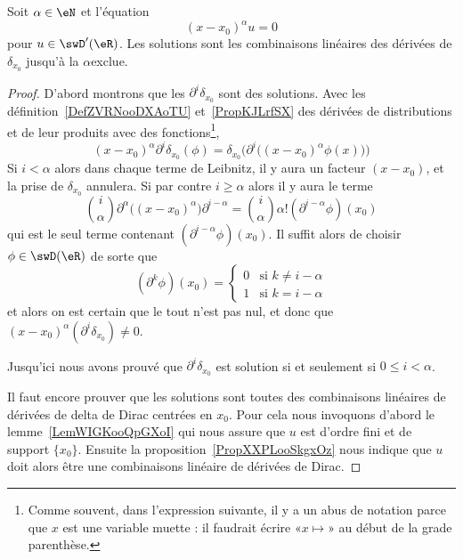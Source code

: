 \begin{theorem}     \label{ThoRDUXooQBlLNb}
    Soit \( \alpha\in \eN\) et l'équation
    \begin{equation}        \label{EqDONTooKPfDWU}
        (x-x_0)^{\alpha}u=0
    \end{equation}
    pour \( u\in\swD'(\eR)\). Les solutions sont les combinaisons linéaires des dérivées de \( \delta_{x_0}\) jusqu'à la \( \alpha\)\ieme exclue.
\end{theorem}

\begin{proof}
    D'abord montrons que les \( \partial^i\delta_{x_0}\) sont des solutions. Avec les définition~\ref{DefZVRNooDXAoTU} et~\ref{PropKJLrfSX} des dérivées de distributions et de leur produits avec des fonctions\footnote{Comme souvent, dans l'expression suivante, il y a un abus de notation parce que \( x\) est une variable muette : il faudrait écrire «\( x\mapsto\)» au début de la grade parenthèse.},
    \begin{equation}
        (x-x_0)^{\alpha}\partial^i\delta_{x_0}(\phi)=\delta_{x_0}\Big( \partial^i\big( (x-x_0)^{\alpha}\phi(x) \big) \Big)
    \end{equation}
    Si \( i<\alpha\) alors dans chaque terme de Leibnitz, il y aura un facteur \( (x-x_0)\), et la prise de \( \delta_{x_0}\) annulera. Si par contre \( i\geq \alpha\) alors il y aura le terme
    \begin{equation}
        \binom{ i }{ \alpha }\partial^{\alpha}\big( (x-x_0)^{\alpha} \big)\partial^{i-\alpha}=\binom{ i }{ \alpha }\alpha!(\partial^{i-\alpha}\phi)(x_0)
    \end{equation}
    qui est le seul terme contenant \( (\partial^{i-\alpha}\phi)(x_0)\). Il suffit alors de choisir \( \phi\in\swD(\eR) \) de sorte que
    \begin{equation}
        (\partial^k\phi)(x_0)=\begin{cases}
            0    &   \text{si } k\neq i-\alpha\\
            1    &    \text{si } k=i-\alpha
        \end{cases}
    \end{equation}
    et alors on est certain que le tout n'est pas nul, et donc que \( (x-x_0)^{\alpha}(\partial^i\delta_{x_0})\neq 0\).

    Jusqu'ici nous avons prouvé que \( \partial^i\delta_{x_0}\) est solution si et seulement si \( 0\leq i<\alpha\).

    Il faut encore prouver que les solutions sont toutes des combinaisons linéaires de dérivées de delta de Dirac centrées en \( x_0\). Pour cela nous invoquons d'abord le lemme~\ref{LemWIGKooQpGXoI} qui nous assure que \( u\) est d'ordre fini et de support \( \{ x_0 \}\). Ensuite la proposition~\ref{PropXXPLooSkgxOz} nous indique que \( u\) doit alors être une combinaisons linéaire de dérivées de Dirac.
\end{proof}
